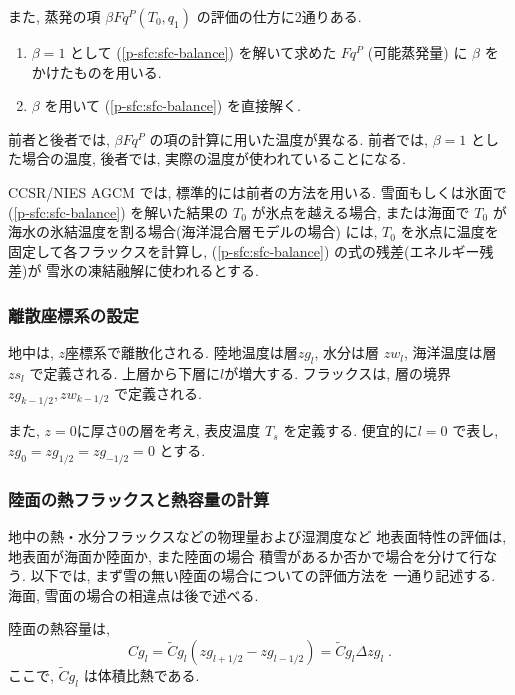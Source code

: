 また, 蒸発の項 $\beta Fq^P(T_0,q_1)$ の評価の仕方に2通りある.
\begin{enumerate}
\item $\beta=1$ として
      (\ref{p-sfc:sfc-balance}) を解いて求めた $Fq^P$ 
      (可能蒸発量) に  $\beta$ をかけたものを用いる.

\item $\beta$ を用いて
      (\ref{p-sfc:sfc-balance}) を直接解く.
\end{enumerate}
前者と後者では, $\beta Fq^P$ の項の計算に用いた温度が異なる.
前者では, $\beta=1$ とした場合の温度,
後者では, 実際の温度が使われていることになる.

CCSR/NIES AGCM では, 標準的には前者の方法を用いる.
雪面もしくは氷面で (\ref{p-sfc:sfc-balance}) を解いた結果の
$T_0$ が氷点を越える場合, 
または海面で $T_0$ が海水の氷結温度を割る場合(海洋混合層モデルの場合)
には, $T_0$ を氷点に温度を固定して各フラックスを計算し,
(\ref{p-sfc:sfc-balance}) の式の残差(エネルギー残差)が
雪氷の凍結融解に使われるとする.

\subsubsection{離散座標系の設定 }

地中は, $z$座標系で離散化される.
陸地温度は層$zg_l$, 水分は層 $zw_l$, 
海洋温度は層$zs_l$ で定義される.
上層から下層に$l$が増大する.
フラックスは, 層の境界 $zg_{k-1/2}, zw_{k-1/2}$ で定義される.

また, $z=0$に厚さ0の層を考え,
表皮温度 $T_s$ を定義する.
便宜的に$l=0$ で表し, $zg_{0} = zg_{1/2} = zg_{-1/2} = 0$ とする.

\subsubsection{陸面の熱フラックスと熱容量の計算 }

地中の熱・水分フラックスなどの物理量および湿潤度など
地表面特性の評価は, 地表面が海面か陸面か, また陸面の場合
積雪があるか否かで場合を分けて行なう. 
以下では, まず雪の無い陸面の場合についての評価方法を
一通り記述する. 海面, 雪面の場合の相違点は後で述べる. 

陸面の熱容量は,
\begin{equation}
  Cg_{l}  = \tilde{C}g_{l}(zg_{l+1/2} - zg_{l-1/2})
          = \tilde{C}g_{l} \Delta zg_{l} \; .
\end{equation}
ここで, $\tilde{C}g_{l}$ は体積比熱である.

